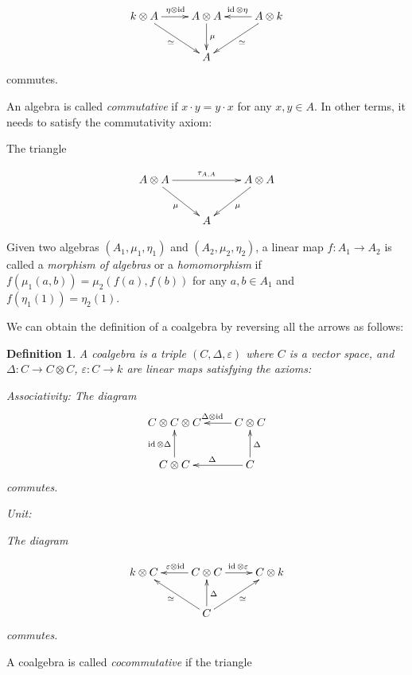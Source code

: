 \documentclass[]{article}
\newtheorem{defn}[theorem]{Definition}
\newcommand{\id}{\operatorname{id}}
\numberwithin{equation}{subsection}
\begin{document}
\begin{equation}
    \xymatrix{
    k \otimes A \ar[r]^{\eta \otimes \id} \ar[rd]_\simeq & A \otimes A \ar[d]^\mu & A \otimes k \ar[l]_{\id \otimes \eta} \ar[ld]^{\simeq} \\
    & A &
    }
\end{equation}
commutes.

An algebra is called \emph{commutative} if $x \cdot y = y \cdot x$ for any $x,y\in A$. In other terms, it needs to satisfy the commutativity axiom:

The triangle 

\begin{equation}
    \xymatrix{
    A \otimes A \ar[rr]^{\tau_{A,A}} \ar[rd]_\mu & & A \otimes A \ar[ld]^\mu \\
    & A &
    }
\end{equation}

Given two algebras $(A_1, \mu_1, \eta_1)$ and $(A_2, \mu_2, \eta_2)$, a linear
map $f: A_1 \to A_2$ is called a \emph{morphism of algebras} or a
\emph{homomorphism} if $f(\mu_1(a,b)) = \mu_2(f(a), f(b))$ for any $a,b\in A_1$ and $f(\eta_1(1)) = \eta_2(1)$.


We can obtain the definition of a coalgebra by reversing all the arrows as follows:

\begin{defn}
    A \emph{coalgebra} is a triple $(C, \Delta, \varepsilon)$ where $C$ is a
    vector space, and $\Delta: C \to C \otimes C$, $\varepsilon: C \to k$ are
    linear maps satisfying the axioms:

Associativity:
The diagram
\begin{equation}
\xymatrix{
C \otimes C \otimes C   & C \otimes C \ar[l]_{\Delta \otimes \id}\\
 C \otimes C\ar[u]^{\id \otimes \Delta}  & C \ar[l]_\Delta \ar[u]_{\Delta}
}
\end{equation}
commutes.

Unit: 

The diagram

\begin{equation}
    \xymatrix{
    k \otimes C  & C \otimes C \ar[l]_{\varepsilon \otimes \id} \ar[r]^{\id \otimes \varepsilon} & C \otimes k   \\
    & C \ar[u]_\Delta \ar[lu]^\simeq \ar[ru]_{\simeq}&
    }
\end{equation}
commutes.
\end{defn}
A coalgebra is called \emph{cocommutative} if the triangle 
\end{document}
